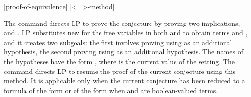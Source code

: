 \ref{proof-of-equivalence}
\ref{<=>-method}

The command  directs LP to prove the conjecture by
proving two implications,  and .  LP substitutes new
 for the free variables in both  and 
to obtain terms  and , and it creates two subgoals: the first
involves proving  using  as an additional hypothesis, the
second proving  using  as an additional hypothesis.  The names
of the hypotheses have the form , where
 is the current value of the  setting.
\p
The command  directs LP to resume the proof of the current
conjecture using this method.  It is applicable only when the current
conjecture has been reduced to a formula of the form  or of the
form  when  and  are boolean-valued terms.
